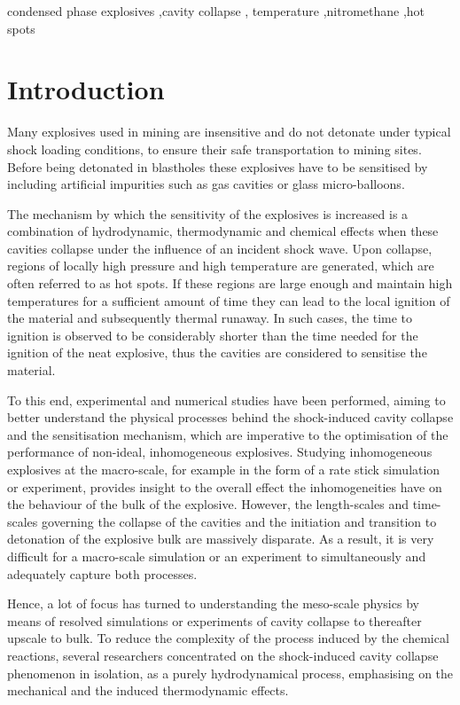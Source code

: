 \documentclass[3p,times,twocolumn]{elsarticle}
\begin{document}
\begin{frontmatter}
\begin{keyword}condensed phase explosives \sep cavity collapse \sep
temperature \sep nitromethane \sep hot spots \end{keyword}

\end{frontmatter}
\section{Introduction}

Many explosives used in mining are insensitive and do not detonate under typical shock loading conditions, to ensure their safe transportation to mining sites. Before being detonated in blastholes these explosives have to be sensitised by including artificial impurities such as gas cavities or glass micro-balloons.

The mechanism by which the sensitivity of the explosives is increased is a combination of hydrodynamic, thermodynamic and chemical effects when these cavities collapse under the influence of an incident shock wave. Upon collapse, regions of locally high pressure and high temperature are generated, which are often referred to as hot spots. If these regions are large enough and maintain high temperatures for a sufficient amount of time they can lead to the local ignition of the material and subsequently thermal runaway. In such cases, the time to ignition is observed to be considerably shorter than the time needed for the ignition of the neat explosive, thus the cavities are considered to sensitise the material. 

To this end, experimental and numerical studies have been performed, aiming to better understand  the physical processes behind the shock-induced cavity collapse and the sensitisation mechanism, which are imperative to the optimisation of the performance of non-ideal, inhomogeneous explosives.
Studying inhomogeneous explosives at the macro-scale, for example in the form of a rate stick simulation or experiment, provides insight to the overall effect the inhomogeneities have on the behaviour of the bulk of the explosive. However, the length-scales and time-scales governing the collapse of the cavities and the initiation and transition to detonation of the explosive bulk are massively disparate. As a result, it is very difficult for a macro-scale simulation or an experiment to simultaneously and adequately capture both processes. 

Hence, a lot of focus has turned to understanding the meso-scale physics by means of resolved simulations or experiments of cavity collapse to thereafter upscale to bulk. To reduce the complexity of the process induced by the chemical reactions, several researchers concentrated on the shock-induced cavity collapse phenomenon in isolation, as a purely hydrodynamical process, emphasising on the mechanical and the induced thermodynamic effects. 
\end{document}
